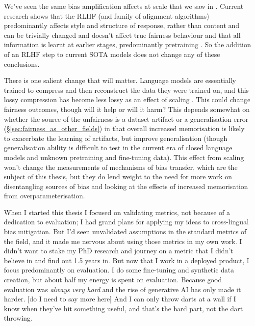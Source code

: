 We've seen the same bias amplification affects at scale \citep{} that we saw in \citet{zhao-etal-2017-men}. Current research shows that the RLHF (and family of alignment algorithms) predominantly affects style and structure of response, rather than content \citep{min-etal-2022-rethinking,  lin2023unlocking} and can be trivially changed and doesn't affect true fairness behaviour \citep{qi2023finetuning} and that all information is learnt at earlier stages, predominantly pretraining \citep{zhou2023lima}.
So the addition of an RLHF step to current SOTA models does not change any of these conclusions.

There is one salient change that will matter. Language models are essentially trained to compress and then reconstruct the data they were trained on, and this lossy compression has become less lossy as an effect of scaling \citep{karamolegkou-etal-2023-copyright}. This could change fairness outcomes, though will it help or will it harm? This depends somewhat on whether the source of the unfairness is a dataset artifact or a generalisation error (\S \ref{sec:fairness_as_other_fields}) in that overall increased memorisation is likely to exacerbate the learning of artifacts, but improve generalisation (though generalisation ability is difficult to test in the current era of closed language models and unknown pretraining and fine-tuning data). This effect from scaling won't change the measurements of mechanisms of bias transfer, which are the subject of this thesis, but they do lend weight to the need for more work on disentangling sources of bias and looking at the effects of increased memorisation from overparameterisation. 

When I started this thesis I focused on validating metrics, not because of a dedication to evaluation; I had grand plans for applying my ideas to cross-lingual bias mitigation. But I'd seen unvalidated assumptions in the standard metrics of the field, and it made me nervous about using those metrics in my own work. I didn't want to stake my PhD research and journey on a metric that I didn't believe in and find out 1.5 years in. But now that I work in a deployed product, I focus predominantly on evaluation. I do some fine-tuning and synthetic data creation, but about half my energy is spent on evaluation. Because good evaluation was \textit{always very hard} and the rise of generative AI has only made it harder. [do I need to say more here] And I can only throw darts at a wall if I know when they've hit something useful, and that's the hard part, not the dart throwing. 

